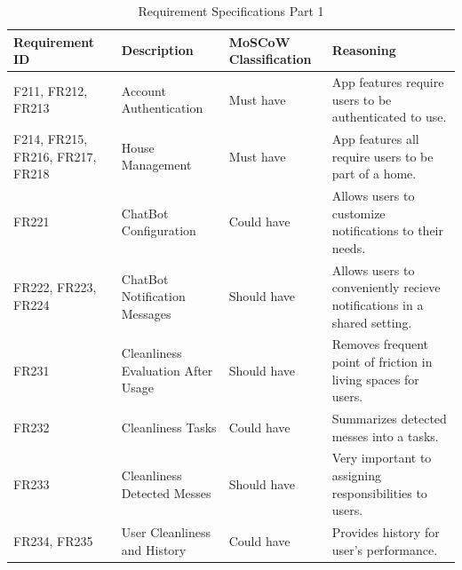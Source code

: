 \documentclass{scrreprt}
\theoremstyle{definition}
\begin{document}
\begin{table}[H]
    \flushleft
    \begin{tabularx}{\textwidth}{|>{\raggedright}X|>{\raggedright}X|>{\raggedright}X|X|}
    \hline
    \textbf{Requirement ID} & \textbf{Description} & \textbf{MoSCoW Classification} & \textbf{Reasoning} \\ \hline
    F211, FR212, FR213 & Account Authentication & Must have & App features require users to be authenticated to use. \\ \hline

    F214, FR215, FR216, FR217, FR218 & House Management & Must have & App features all require users to be part of a home. \\ \hline

    FR221 & ChatBot Configuration & Could have & Allows users to customize notifications to their needs. \\ \hline

    FR222, FR223, FR224 & ChatBot Notification Messages & Should have & Allows users to conveniently recieve notifications in a shared setting. \\ \hline

    FR231 & Cleanliness Evaluation After Usage & Should have & Removes frequent point of friction in living spaces for users. \\ \hline

    FR232 & Cleanliness Tasks & Could have & Summarizes detected messes into a tasks. \\ \hline

    FR233 & Cleanliness Detected Messes & Should have & Very important to assigning responsibilities to users. \\ \hline

    FR234, FR235 & User Cleanliness and History & Could have & Provides history for user's performance. \\ \hline
\end{tabularx}
\caption{Requirement Specifications Part 1}
\end{table}
\end{document}
